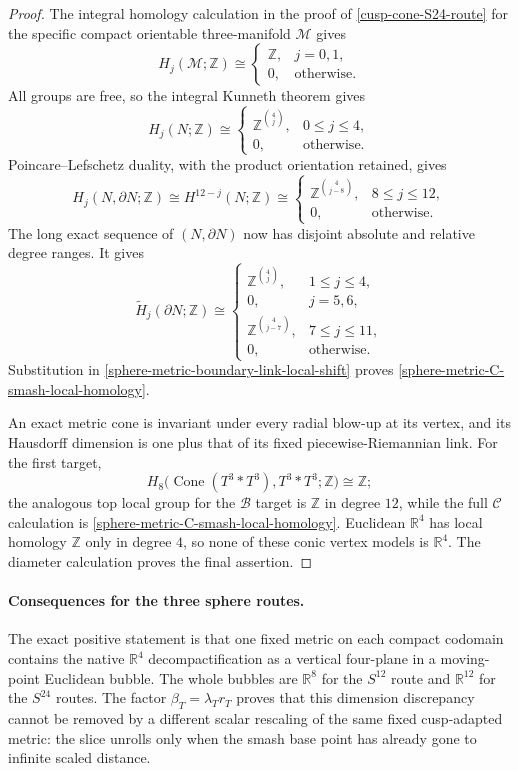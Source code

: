 \begin{proof}
The integral homology calculation in the proof of
\cref{cusp-cone-S24-route} for the specific compact orientable
three-manifold \(\mathcal M\) gives
\[
 H_j(\mathcal M;\mathbb Z)\cong
 \begin{cases}
  \mathbb Z,&j=0,1,\\
  0,&\text{otherwise}.
 \end{cases}
\]
All groups are free, so the integral Kunneth theorem gives
\[
 H_j(N;\mathbb Z)\cong
 \begin{cases}
  \mathbb Z^{\binom4j},&0\leq j\leq4,\\
  0,&\text{otherwise}.
 \end{cases}
\]
Poincare--Lefschetz duality, with the product orientation retained, gives
\[
 H_j(N,\partial N;\mathbb Z)
 \cong H^{12-j}(N;\mathbb Z)
 \cong
 \begin{cases}
  \mathbb Z^{\binom4{j-8}},&8\leq j\leq12,\\
  0,&\text{otherwise}.
 \end{cases}
\]
The long exact sequence of \((N,\partial N)\) now has disjoint absolute
and relative degree ranges.  It gives
\[
 \widetilde H_j(\partial N;\mathbb Z)\cong
 \begin{cases}
  \mathbb Z^{\binom4j},&1\leq j\leq4,\\
  0,&j=5,6,\\
  \mathbb Z^{\binom4{j-7}},&7\leq j\leq11,\\
  0,&\text{otherwise}.
 \end{cases}
\]
Substitution in
\eqref{sphere-metric-boundary-link-local-shift} proves
\eqref{sphere-metric-C-smash-local-homology}.

An exact metric cone is invariant under every radial blow-up at its vertex,
and its Hausdorff dimension is one plus that of its fixed
piecewise-Riemannian link.  For the first target,
\[
 H_8\bigl(\operatorname{Cone}(T^3*T^3),T^3*T^3;\mathbb Z\bigr)
 \cong\mathbb Z;
\]
the analogous top local group for the \(\mathcal B\) target is
\(\mathbb Z\) in degree \(12\), while the full \(\mathcal C\) calculation
is \eqref{sphere-metric-C-smash-local-homology}.  Euclidean
\(\mathbb R^4\) has local homology \(\mathbb Z\) only in degree \(4\), so
none of these conic vertex models is \(\mathbb R^4\).  The diameter
calculation proves the final assertion.
\end{proof}

\paragraph{Consequences for the three sphere routes.}
The exact positive statement is that one fixed metric on each compact
codomain contains the native \(\mathbb R^4\) decompactification as a
vertical four-plane in a moving-point Euclidean bubble.  The whole bubbles
are \(\mathbb R^8\) for the \(S^{12}\) route and \(\mathbb R^{12}\) for the
\(S^{24}\) routes.  The factor \(\beta_T=\lambda_Tr_T\) proves that this
dimension discrepancy cannot be removed by a different scalar rescaling
of the same fixed cusp-adapted metric: the slice unrolls only when the
smash base point has already gone to infinite scaled distance.

